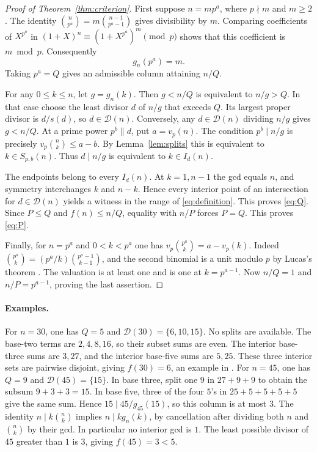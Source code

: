 \documentclass[a4paper,11pt]{article}
\newcommand{\colg}[2]{g_{#1}(#2)}
\newcommand{\crit}{\mathcal D}
\begin{document}
\begin{proof}[Proof of Theorem~\ref{thm:criterion}]
First suppose \(n=mp^a\), where \(p\nmid m\) and \(m\ge2\).
The identity
\(\binom{n}{p^a}=m\binom{n-1}{p^a-1}\) gives divisibility by \(m\).
Comparing coefficients of \(X^{p^a}\) in
\((1+X)^n\equiv(1+X^{p^a})^m\pmod p\) shows that this coefficient is
\(m\bmod p\). Consequently
\begin{equation}\label{eq:attain}
 \colg n{p^a}=m.
\end{equation}
Taking \(p^a=Q\) gives an admissible column attaining \(n/Q\).

For any \(0\le k\le n\), let \(g=\colg nk\). Then \(g<n/Q\) is equivalent
to \(n/g>Q\). In that case choose the least divisor \(d\) of \(n/g\) that
exceeds \(Q\). Its largest proper divisor is \(d/s(d)\), so \(d\in\crit(n)\).
Conversely, any \(d\in\crit(n)\) dividing \(n/g\) gives \(g<n/Q\).
At a prime power \(p^b\parallel d\), put \(a=v_p(n)\). The condition
\(p^b\mid n/g\) is precisely \(v_p\binom nk\le a-b\). By
Lemma~\ref{lem:splits} this is equivalent to \(k\in S_{p,b}(n)\).
Thus \(d\mid n/g\) is equivalent to \(k\in I_d(n)\).

The endpoints belong to every \(I_d(n)\). At \(k=1,n-1\) the gcd equals
\(n\), and symmetry interchanges \(k\) and \(n-k\). Hence every interior
point of an intersection for \(d\in\crit(n)\) yields a witness in the
range of \eqref{eq:definition}. This proves \eqref{eq:Q}. Since
\(P\le Q\) and \(f(n)\le n/Q\), equality with \(n/P\) forces \(P=Q\).
This proves \eqref{eq:P}.

Finally, for \(n=p^a\) and \(0<k<p^a\) one has
\(v_p\binom{p^a}{k}=a-v_p(k)\). Indeed
\(\binom{p^a}{k}=(p^a/k)\binom{p^a-1}{k-1}\), and the second binomial is
a unit modulo \(p\) by Lucas's theorem \cite{Granville}.
The valuation is at least one and is one at \(k=p^{a-1}\).
Now \(n/Q=1\) and \(n/P=p^{a-1}\), proving the last assertion.
\end{proof}

\paragraph{Examples.}
For \(n=30\), one has \(Q=5\) and \(\crit(30)=\{6,10,15\}\).
No splits are available. The base-two terms are \(2,4,8,16\), so their
subset sums are even. The interior base-three sums are \(3,27\), and the
interior base-five sums are \(5,25\). These three interior sets are
pairwise disjoint, giving \(f(30)=6\), an example in \cite{ES}.
For \(n=45\), one has \(Q=9\) and \(\crit(45)=\{15\}\).
In base three, split one \(9\) in \(27+9+9\) to obtain the subsum
\(9+3+3=15\). In base five, three of the four \(5\)'s in
\(25+5+5+5+5\) give the same sum. Hence \(15\mid45/\colg{45}{15}\),
so this column is at most \(3\). The identity
\(n\mid k\binom nk\) implies \(n\mid k\colg nk\), by cancellation after
dividing both \(n\) and \(\binom nk\) by their gcd. In particular no
interior gcd is \(1\). The least possible divisor of \(45\) greater than
\(1\) is \(3\), giving \(f(45)=3<5\).
\end{document}

